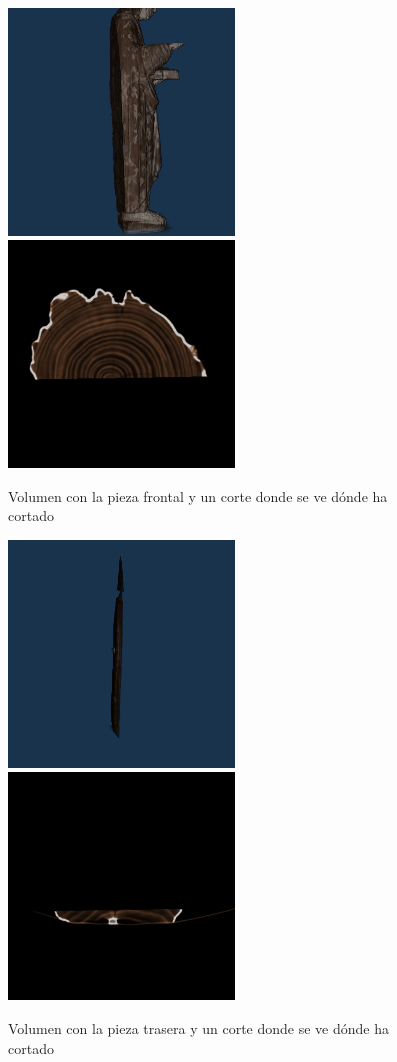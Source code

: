 \begin{figure}[H]
	\centering
	\includegraphics[width=6cm]{imagenes/resultados/segmentacion/san-juan-evangelista/frontal-3d}
	\includegraphics[width=6cm]{imagenes/resultados/segmentacion/san-juan-evangelista/frontal-corte}
	\caption{Volumen con la pieza frontal y un corte donde se ve dónde ha cortado}
	\label{fig:resultados/segmentacion/san-juan-evangelista/frontal}
\end{figure}

\begin{figure}[H]
	\centering
	\includegraphics[width=6cm]{imagenes/resultados/segmentacion/san-juan-evangelista/trasero-3d}
	\includegraphics[width=6cm]{imagenes/resultados/segmentacion/san-juan-evangelista/trasero-corte}
	\caption{Volumen con la pieza trasera y un corte donde se ve dónde ha cortado}
	\label{fig:resultados/segmentacion/san-juan-evangelista/trasero}
\end{figure}

